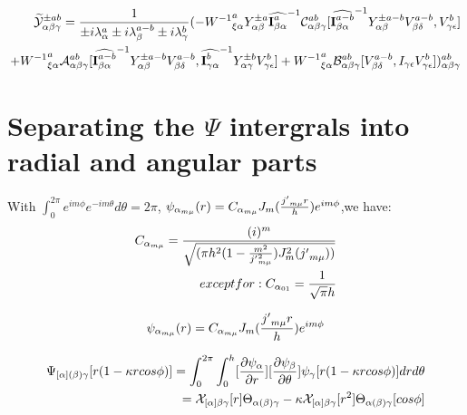 \documentclass{Note}
\begin{document}
\begin{equation}
\begin{aligned}
\widetilde{\mathcal{Y}}_{\alpha\beta\gamma}^{\pm ab} =
{1\over {\pm i \lambda_\alpha^a \pm i \lambda_\beta^{a-b }\pm i \lambda_\gamma^b}}
(-{W^{-1}}_{\xi\alpha}^a Y_{\alpha\beta}^{\pm a}{\widehat{\textbf{I}_{\beta \alpha}^a}}^{-1}  \mathcal{C}_{\alpha\beta\gamma}^{ab}[{\widehat{\textbf{I}_{\beta \alpha}^{a-b}}}^{-1}  Y_{\alpha\beta}^{\pm a-b} V_{\beta\delta}^{a-b}, V_{\gamma\epsilon}^{b} ]\\
+{W^{-1}}_{\xi\alpha}^a \mathcal{A}_{\alpha\beta\gamma}^{ab}[{\widehat{\textbf{I}_{\beta \alpha}^{a-b}}}^{-1}  Y_{\alpha\beta}^{\pm a-b}V_{\beta\delta}^{a-b} ,{\widehat{\textbf{I}_{\gamma \alpha}^{b}}}^{-1}  Y_{\alpha\gamma}^{\pm b} V_{\gamma\epsilon}^{b}] 
+{W^{-1}}_{\xi\alpha}^a \mathcal{B}_{\alpha\beta\gamma}^{ab}[V_{\beta\delta}^{a-b} ,I_{\gamma\epsilon}V_{\gamma\epsilon}^{b} ])_{\alpha\beta\gamma}^{ ab}
\end{aligned}
\end{equation}



\section{Separating the $\Psi$ intergrals into radial and angular parts}

With $\int_0^{2\pi} e^{im\phi}e^{-im\theta}  d\theta=2\pi$,
$\psi_{\alpha_{m\mu}}(r)=C_{\alpha_{m\mu}}J_m({{j'}_{m\mu} r\over h})e^{im\phi}$,we have:
\begin{equation}
\begin{aligned}
C_{\alpha_{m\mu}}={(i)^m \over \sqrt{({{\pi h^2}(1-{m^2\over {j'}_{m\mu}^2} )}J^2_m({j'}_{m\mu}))}}\\
except for:
C_{\alpha_{01}}={1 \over \sqrt{\pi}h}
\end{aligned}
\end{equation}

\begin{equation}
\begin{aligned}
\psi_{\alpha_{m\mu}}(r)=C_{\alpha_{m\mu}}J_m({{j'}_{m\mu} r\over h})e^{im\phi}
\end{aligned}
\end{equation}



\begin{equation}
\begin{aligned}
\Psi_{[\alpha](\beta)\gamma}[r(1-\kappa r cos\phi)]=\int_0^{2\pi} \int_0^h [{\partial \psi_\alpha \over \partial r}][{\partial \psi_\beta \over \partial \theta}] \psi_\gamma [r(1-\kappa r cos\phi)] dr d\theta \\
=\mathcal{X}_{[\alpha]\beta\gamma}[r]\Theta_{\alpha(\beta)\gamma}-\kappa \mathcal{X}_{[\alpha]\beta\gamma}[r^2]\Theta_{\alpha(\beta)\gamma}[cos\phi]
\end{aligned}
\end{equation}
\end{document}
